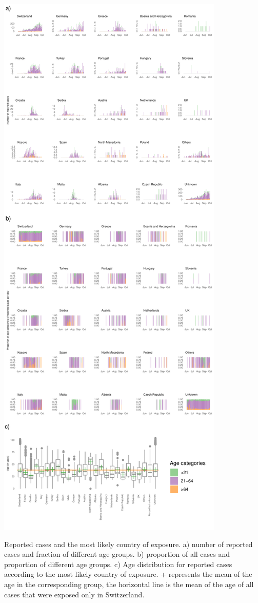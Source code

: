 \documentclass[10pt, a4paper, twoside]{article}
\begin{document}
\clearpage
\begin{suppfigure}[h]
\centering
\includegraphics[scale=0.6]{SF2_2021-05-26.pdf}
\caption{Reported cases and the most likely country of exposure.
a) number of reported cases and fraction of different age groups.
b) proportion of all cases and proportion of different age groups.
c) Age distribution for reported cases according to the most likely country of exposure.
+ represents the mean of the age in the corresponding group, the horizontal line is the mean of the age of all cases that were exposed only in Switzerland.}
\label{sf2}
\end{suppfigure}
\end{document}
